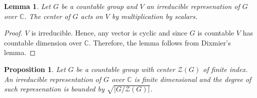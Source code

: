 \documentclass[12pt, reqno]{amsart}
\newtheorem{proposition}[theorem]{Proposition}
\newtheorem{lemma}[theorem]{Lemma}
\newcommand{\C}{ {\mathbb C} }
\begin{document}
\begin{lemma}
Let $G$ be a countable group and $V$ an irreducible represenation of $G$ over $\C$. The center of $G$ acts on $V$ by multiplication by scalars.
\end{lemma}
\begin{proof}
$V$ is irreducible. Hence, any vector is cyclic and since $G$ is countable $V$ has countable dimension over $\C$. Therefore, the lemma follows from Dixmier's lemma.%
\end{proof}
\begin{proposition}
Let $G$ be a countable group with center $\mathcal{Z}(G)$ of finite index. An irreducible representation of $G$ over $\C$ is finite dimensional and the degree of such represenation is bounded by $\sqrt{\vert G/\mathcal{Z}(G) \vert}$.
\end{proposition}
\end{document}

